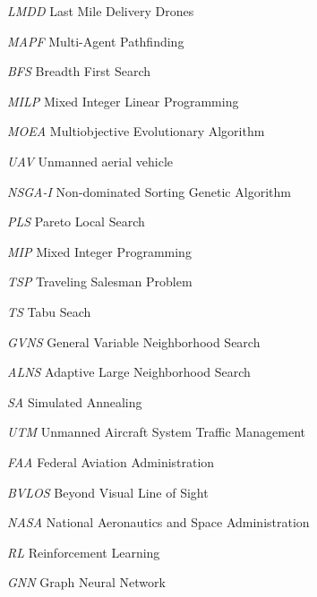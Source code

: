 \begin{siglas}
    \item[\textit{LMDD}] Last Mile Delivery Drones
    \item[\textit{MAPF}] Multi-Agent Pathfinding
    \item[\textit{BFS}] Breadth First Search
    \item[\textit{MILP}] Mixed
Integer Linear Programming
    \item[\textit{MOEA}] Multiobjective Evolutionary Algorithm
    \item[\textit{UAV}] Unmanned aerial vehicle
    \item[\textit{NSGA-I}] Non-dominated Sorting Genetic Algorithm
    \item[\textit{PLS}] Pareto Local Search
    \item [\textit{MIP}] Mixed Integer Programming
    \item [\textit{TSP}] Traveling Salesman Problem
    \item [\textit{TS}] Tabu Seach
    \item [\textit{GVNS}] General Variable Neighborhood Search
    \item [\textit{ALNS}] Adaptive Large Neighborhood Search
    \item [\textit{SA}] Simulated Annealing
    \item[\textit{UTM}] Unmanned
Aircraft System Traffic Management
    \item[\textit{FAA}] Federal Aviation Administration 
    \item[\textit{BVLOS}] Beyond Visual Line of Sight
    \item[\textit{NASA}] National Aeronautics and Space Administration
    \item[\textit{RL}] Reinforcement Learning
    \item[\textit{GNN}] Graph Neural Network
\end{siglas}
